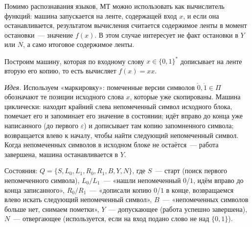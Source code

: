 \documentclass[12pt]{article}
\begin{document}
    \begin{note}
    	Помимо распознавания языков, МТ можно использовать как вычислитель функций: машина запускается на ленте, содержащей вход $x$, и если она останавливается, результатом вычисления считается содержимое ленты в момент остановки~--- значение $f(x)$. В этом случае интересует не факт остановки в $Y$ или $N$, а само итоговое содержимое ленты.
    \end{note}
    
    \begin{example}[МТ, вычисляющая $f(x) = xx$]
    	Построим машину, которая по входному слову $x \in \{0,1\}^*$ дописывает на ленте вторую его копию, то есть вычисляет $f(x) = xx$.
    	
    	\textit{Идея.} Используем «маркировку»: помеченные версии символов $\dot 0, \dot 1 \in \Pi$ обозначают те позиции исходного слова $x$, которые уже скопированы. Машина циклически: находит крайний слева непомеченный символ исходного блока, помечает его и запоминает его значение в состоянии; идёт вправо до конца уже написанного (до первого $\varepsilon$) и дописывает там копию запомненного символа; возвращается влево к началу, чтобы найти следующий непомеченный символ. Когда непомеченных символов в исходном блоке не остаётся~--- работа завершена, машина останавливается в $Y$.
    	
    	Состояния: $Q = \{ S, L_0, L_1, R_0, R_1, B, Y, N \}$, где $S$~--- старт (поиск первого непомеченного символа), $L_0/L_1$~--- «нашли непомеченный $0$/$1$, идём вправо до конца записанного», $R_0/R_1$~--- «дописали копию $0$/$1$ в конце, возвращаемся влево искать следующий непомеченный символ», $B$~--- «непомеченных символов больше нет, снимаем пометки», $Y$~--- допускающее (работа успешно завершена), $N$~--- отвергающее (используется, если на вход подано слово не над $\{0,1\}$).
    	

\end{example}
\end{document}
